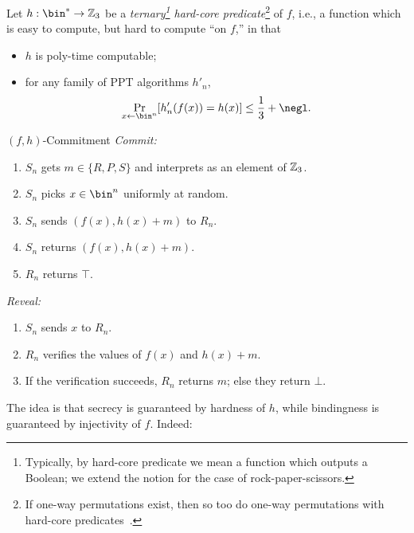 Let $h: \bin^*\rightarrow\ZZ_3$ be a \emph{ternary\footnote{Typically, by
		hard-core predicate we mean a function which outputs a Boolean; we extend the
		notion for the case of rock-paper-scissors.} hard-core predicate}\footnote{If
	one-way permutations exist, then so too do one-way permutations with hard-core
	predicates~\cite{yao-1982}.} of $f$, i.e., a
function which is easy to compute, but hard to compute ``on $f$,'' in that
\begin{itemize}
	\item $h$ is poly-time computable;
	\item for any family of PPT algorithms $h'_n$, \[
		      \Pr_{x\leftarrow\bin^n}[h'_n(f(x)) = h(x)] \leq \frac{1}{3} + \negl.
	      \]
\end{itemize}

\begin{prot}{$(f,h)$-Commitment}\label{prot:commitment}
	\newline
	\emph{Commit:}
	\begin{enumerate}[itemsep=-0.2em,topsep=-0.2em]
		\item $S_n$ gets $m\in\{R,P,S\}$ and interprets as an element of $\mathbb{Z}_3$.
		\item $S_n$ picks $x\in\bin^n$ uniformly at random.
		\item $S_n$ sends $(f(x), h(x) + m)$ to $R_n$.
		\item $S_n$ returns $(f(x), h(x) + m)$.
		\item $R_n$ returns $\top$.
	\end{enumerate}
	\vspace{1em}
	\emph{Reveal:}
	\begin{enumerate}[itemsep=-0.2em,topsep=-0.2em]
		\item $S_n$ sends $x$ to $R_n$.
		\item $R_n$ verifies the values of $f(x)$ and $h(x) + m$.
		\item If the verification succeeds, $R_n$ returns $m$; else they return $\bot$.
	\end{enumerate}
\end{prot}

\noindent
The idea is that secrecy is guaranteed by hardness of $h$, while
bindingness is guaranteed by injectivity of $f$. Indeed:

